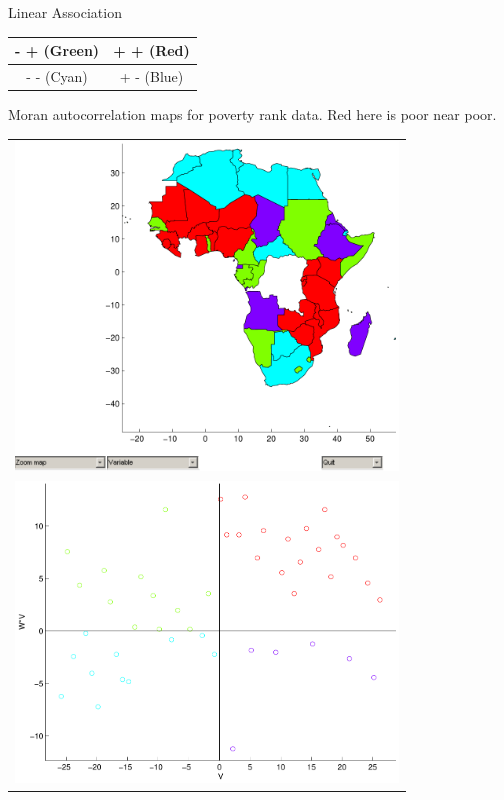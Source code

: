 \begin{center}

 Linear Association \newline

 \begin{tabular}{|c|c|}
  \hline
  - + (Green) &  + + (Red)\\
  \hline
  - - (Cyan) &  + - (Blue) \\
  \hline
\end{tabular}
\end{center}

\newpage

Moran autocorrelation maps for poverty rank data.  Red here is
poor near poor.

\begin{tabular}{ c}
\hline
\includegraphics[width=4in]{Images/GIS/MoranMapForPovertyAggregateRanks.pdf}\\
\includegraphics[width=4in]{Images/GIS/MoranScatterPlotForPovertyAggregateRanks.pdf}
\end{tabular}
\newpage

